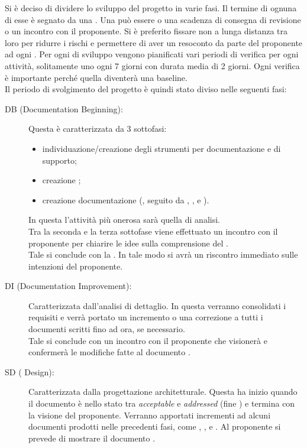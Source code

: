 	Si è deciso di dividere lo sviluppo del progetto in varie fasi. Il termine di ognuna di esse è segnato da una . Una  può essere o una scadenza di consegna di revisione o un incontro con il proponente. Si è preferito fissare  non a lunga distanza tra loro per ridurre i rischi e permettere di aver un resoconto da parte del proponente ad ogni . Per ogni  di sviluppo vengono pianificati vari periodi di verifica per ogni attività, solitamente uno ogni 7 giorni con durata media di 2 giorni. Ogni verifica è importante perché quella diventerà una baseline.\\
	Il periodo di svolgimento del progetto è quindi stato diviso nelle seguenti fasi:
	\begin{description}
		\item[ DB (Documentation Beginning):] Questa  è caratterizzata da 3 sottofasi:
			\begin{itemize}
				\item individuazione/creazione degli strumenti per documentazione e di supporto;
				\item creazione ;
				\item creazione documentazione (, seguito da , ,  e ).
			\end{itemize}
			In questa  l'attività più onerosa sarà quella di analisi.\\Tra la seconda e la terza sottofase viene effettuato un incontro con il proponente per chiarire le idee sulla comprensione del .\\Tale {} si conclude con la . In tale modo si avrà un riscontro immediato sulle intenzioni del proponente.
		\item[ DI (Documentation Improvement):] Caratterizzata dall’analisi di dettaglio. In questa  verranno consolidati i requisiti  e verrà portato un incremento o una correzione a tutti i documenti scritti fino ad ora, se necessario.\\Tale {} si conclude con un incontro con il proponente che visionerà e confermerà le modifiche fatte al documento .
		\item[ SD ( Design):] Caratterizzata dalla progettazione architetturale. Questa  ha inizio quando il documento  è nello stato tra \textit{acceptable} e \textit{addressed} (fine ) e termina con la visione del proponente. Verranno apportati incrementi ad alcuni documenti prodotti nelle precedenti fasi, come , ,  e . Al proponente si prevede di mostrare il documento .

\end{description}
